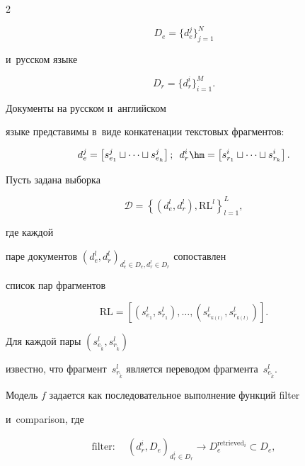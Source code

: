 \begin{multicols}{2}
\noindent


$$


D_e = \{d_e^j\}_{j=1}^N


$$ 


и~русском языке 


$$


D_r = \{d_r^i\}_{i=1}^M.


$$


 Документы на русском и~английском 


языке представимы в~виде конкатенации текстовых фрагментов:


$$


d_e^j = \left[s_{e_1}^j \sqcup \cdots \sqcup s_{e_h}^j\right];\enskip


d_r^i \hm= \left[s_{r_1}^i 


\sqcup \cdots \sqcup s_{r_k}^i\right].


$$





Пусть задана выборка  


$$


\mathcal{D}=\left\{(d_e^l, d_r^l), \mathrm{RL}^l\right\}_{l=1}^L,


$$


 где каждой 


паре документов $(d_e^l, d_r^l)_{d_e^l \in D_e, d_r^l \in D_r}$ сопоставлен 


список пар фрагментов 


$$


\mathrm{RL}= \left[(s_{e_1}^l, s_{r_1}^l), \ldots, (s_{e_{k(l)}}^l, 


s_{r_{k(l)}}^l)\right].


$$


 Для каждой пары $(s_{e_{\tilde{k}}}^l, s_{r_{\tilde{k}}}^l)$ 


известно, что фрагмент~$s_{r_{\tilde{k}}}^l$ является переводом фрагмента~$s_{e_{\tilde{k}}}^l$.








Модель $f$ задается как последовательное выполнение функций {filter} 


и~comparison, где


\begin{align*}


\mbox{filter:}&\ \ (d_r^i, D_e)_{d_r^i \in D_r} \rightarrow D_e^{\mathrm{retrieved}_i} \subset 


D_e,\\



\end{align*}
\end{multicols}
